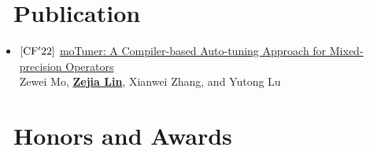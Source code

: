 \documentclass{resume}
\begin{document}
\section{\faBook\ Publication}

\begin{itemize}
  \item $[\rm{CF'22}]$ \href{https://dl.acm.org/doi/10.1145/3528416.3530231}{moTuner: A Compiler-based Auto-tuning Approach for Mixed-precision Operators} \\ Zewei Mo, \underline{\textbf{Zejia Lin}}, Xianwei Zhang, and Yutong Lu
\end{itemize}



\section{\faHeartO\ Honors and Awards}


%
%
\end{document}
